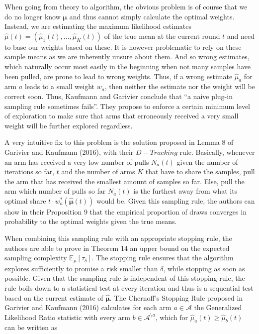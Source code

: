 \documentclass[12pt,]{article}
\begin{document}
When going from theory to algorithm, the obvious problem is of course
that we do no longer know \(\bm{\mu}\) and thus cannot simply calculate
the optimal weights. Instead, we are estimating the maximum likelihood
estimates \(\hat{\mu}(t) = (\hat{\mu}_1(t), \dots, \hat{\mu}_K(t))\) of
the true mean at the current round \(t\) and need to base our weights
based on these. It is however problematic to rely on these sample means
as we are inherently unsure about them. And so wrong estimates, which
naturally occur most easily in the beginning when not many samples have
been pulled, are prone to lead to wrong weights. Thus, if a wrong
estimate \(\hat{\mu}_a\) for arm \(a\) leads to a small weight \(w_a\),
then neither the estimate nor the weight will be correct soon. Thus,
Kaufmann and Garivier conclude that ``a naive plug-in sampling rule
sometimes fails''. They propose to enforce a certain minimum level of
exploration to make sure that arms that erroneously received a very
small weight will be further explored regardless.

A very intuitive fix to this problem is the solution proposed in Lemma 8
of Garivier and Kaufmann (2016), with their \(D-Tracking\) rule.
Basically, whenever an arm has received a very low number of pulls
\(N_a(t)\) given the number of iterations so far, \(t\) and the number
of arms \(K\) that have to share the samples, pull the arm that has
received the smallest amount of samples so far. Else, pull the arm which
number of pulls so far \(N_a(t)\) is the furthest away from what its
optimal share \(t\cdot w^*_a(\hat{\bm{\mu}}(t))\) would be. Given this
sampling rule, the authors can show in their Proposition 9 that the
empirical proportion of draws converges in probability to the optimal
weights given the true means.

When combining this sampling rule with an appropriate stopping rule, the
authors are able to prove in Theorem 14 an upper bound on the expected
sampling complexity \(\mathbb{E}_{\mu}[\tau_{\delta}]\). The stopping
rule ensures that the algorithm explores sufficiently to promise a risk
smaller than \(\delta\), while stopping as soon as possible. Given that
the sampling rule is independent of this stopping rule, the rule boils
down to a statistical test at every iteration and thus is a sequential
test based on the current estimate of \(\hat{\bm{\mu}}\). The Chernoff's
Stopping Rule proposed in Garivier and Kaufmann (2016) calculates for
each arm \(a\in \mathcal{A}\) the Generalized Likelihood Ratio statistic
with every arm \(b \in \mathcal{A}^{\setminus a}\), which for
\(\hat{\mu}_a(t) \geq \hat{\mu}_b(t)\) can be written as
\end{document}
